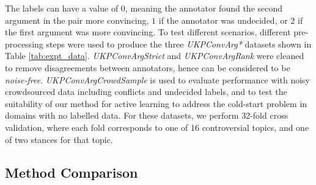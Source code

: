 The labels can have a value of $0$, meaning the annotator found the second argument in the pair more convincing,
$1$ if the annotator was undecided, or $2$ if the first argument was more convincing.
To test different scenarios, different pre-processing steps were used to produce the
three \emph{UKPConvArg*} datasets shown in Table \ref{tab:expt_data}.
\emph{UKPConvArgStrict} and \emph{UKPConvArgRank} were cleaned to remove disagreements between annotators, hence can be considered to be \emph{noise-free}.
 \emph{UKPConvArgCrowdSample} is used to evaluate performance with noisy crowdsourced data 
including conflicts and undecided labels, and to test the suitability of our method for active learning
to address the cold-start problem in domains with no labelled data.
For these datasets, we perform 32-fold cross validation, where
each fold corresponds to one of 16 controversial topics, and one of two stances for that topic.
 
\subsection{Method Comparison}

